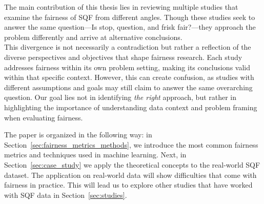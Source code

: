 The main contribution of this thesis lies in reviewing multiple studies that examine the fairness of SQF from different angles. Though these studies seek to answer the same question—Is stop, question, and frisk fair?—they approach the problem differently and arrive at alternative conclusions.\\
This divergence is not necessarily a contradiction but rather a reflection of the diverse perspectives and objectives that shape fairness research. Each study addresses fairness within its own problem setting, making its conclusions valid within that specific context. However, this can create confusion, as studies with different assumptions and goals may still claim to answer the same overarching question. Our goal lies not in identifying \textit{the right} approach, but rather in highlighting the importance of understanding data context and problem framing when evaluating fairness.\par
The paper is organized in the following way: in Section~\ref{sec:fairness_metrics_methods}, we introduce the most common fairness metrics and techniques used in machine learning.
Next, in Section~\ref{sec:case_study} we apply the theoretical concepts to the real-world SQF dataset. 
The application on real-world data will show difficulties that come with fairness in practice.
This will lead us to explore other studies that have worked with SQF data in Section~\ref{sec:studies}. 


